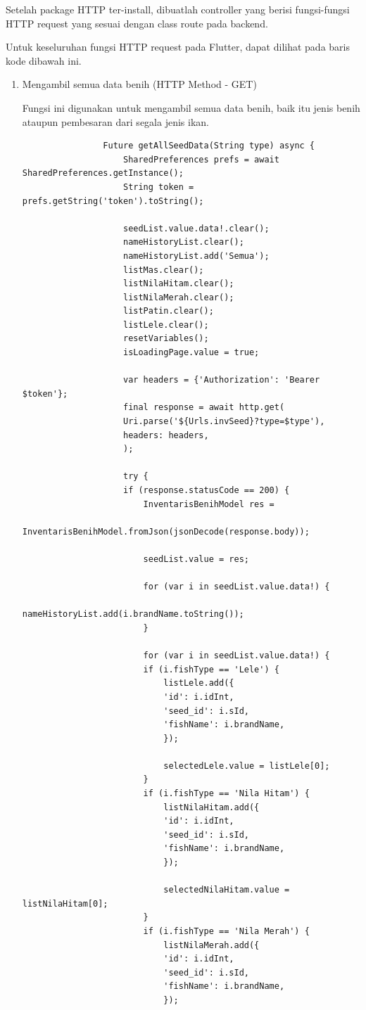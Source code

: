 \begin{spacing}{1.5}
\begin{enumerate}
		Setelah package HTTP ter-install, dibuatlah controller yang berisi fungsi-fungsi HTTP request yang sesuai dengan class route pada backend.

		Untuk keseluruhan fungsi HTTP request pada Flutter, dapat dilihat pada baris kode dibawah ini.

		\begin{enumerate}
			\item Mengambil semua data benih (HTTP Method - GET) 
			
			Fungsi ini digunakan untuk mengambil semua data benih, baik itu jenis benih ataupun pembesaran dari segala jenis ikan.

			\begin{lstlisting}
				Future getAllSeedData(String type) async {
					SharedPreferences prefs = await SharedPreferences.getInstance();
					String token = prefs.getString('token').toString();

					seedList.value.data!.clear();
					nameHistoryList.clear();
					nameHistoryList.add('Semua');
					listMas.clear();
					listNilaHitam.clear();
					listNilaMerah.clear();
					listPatin.clear();
					listLele.clear();
					resetVariables();
					isLoadingPage.value = true;

					var headers = {'Authorization': 'Bearer $token'};
					final response = await http.get(
					Uri.parse('${Urls.invSeed}?type=$type'),
					headers: headers,
					);

					try {
					if (response.statusCode == 200) {
						InventarisBenihModel res =
							InventarisBenihModel.fromJson(jsonDecode(response.body));

						seedList.value = res;

						for (var i in seedList.value.data!) {
						nameHistoryList.add(i.brandName.toString());
						}

						for (var i in seedList.value.data!) {
						if (i.fishType == 'Lele') {
							listLele.add({
							'id': i.idInt,
							'seed_id': i.sId,
							'fishName': i.brandName,
							});

							selectedLele.value = listLele[0];
						}
						if (i.fishType == 'Nila Hitam') {
							listNilaHitam.add({
							'id': i.idInt,
							'seed_id': i.sId,
							'fishName': i.brandName,
							});

							selectedNilaHitam.value = listNilaHitam[0];
						}
						if (i.fishType == 'Nila Merah') {
							listNilaMerah.add({
							'id': i.idInt,
							'seed_id': i.sId,
							'fishName': i.brandName,
							});


\end{lstlisting}
\end{enumerate}
\end{enumerate}
\end{spacing}
